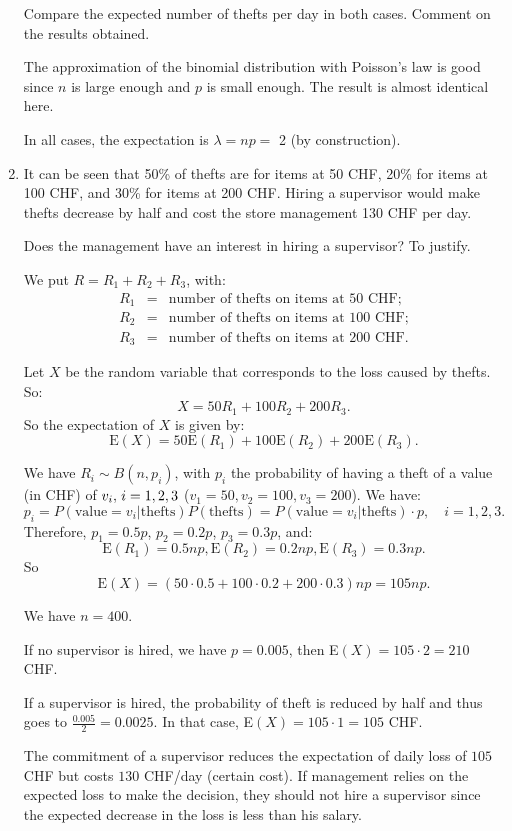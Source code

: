 \documentclass[12pt,thmsa]{article}\usepackage[]{graphicx}\usepackage[]{color}
\begin{document}
\begin{enumerate}
\noindent Compare the expected number of thefts per day in both cases. Comment on the results obtained.

The approximation of the binomial distribution with Poisson's law is good since $ n $ is large enough and $ p $ is small enough. The result is almost identical here.

In all cases, the expectation is $ \lambda = np = $ 2 (by construction).

\item It can be seen that 50\% of thefts are for items at 50 CHF, 20\% for items at 100 CHF, and 30\% for items at 200 CHF. Hiring a supervisor would make thefts decrease by half and cost the store management 130 CHF per day.

\noindent Does the management have an interest in hiring a supervisor? To justify.

We put $R=R_1+R_2+R_3$, with:
 \begin{eqnarray*}
R_{1} & = & \text{number of thefts on items at 50 CHF}; \nonumber \\
R_{2} & = & \text{number of thefts on items at 100 CHF}; \nonumber \\
R_{3} & = & \text{number of thefts on items at 200 CHF}. \nonumber %
\end{eqnarray*}

Let $X$ be the random variable that corresponds to the loss caused by thefts. So:
$$X=50R_{1}+100R_{2}+200R_{3}.$$
So the expectation of $X$ is given by:
$$\text{E}(X)=50\text{E}(R_{1})+100\text{E}(R_{2})+200\text{E}(R_{3}).$$

We have $R_i \sim B(n,p_i)$, with $ p_i $ the probability of having a theft of a value (in CHF) of $v_i, \hspace{0.05cm} i=1,2,3$ ($v_1=50, v_2=100, v_3=200$). We have:
$$p_i=P(\text{value}=v_i|\text{thefts})P(\text{thefts})=P(\text{value}=v_i|\text{thefts})\cdot p, \quad i=1,2,3.$$
Therefore, $p_1=0.5p$, $p_2=0.2p$, $p_3=0.3p$, and:
$$\text{E}(R_{1})=0.5np, \text{E}(R_{2})=0.2np, \text{E}(R_{3})=0.3np.$$
So
$$ \text{E}(X)=(50 \cdot 0.5 + 100 \cdot 0.2 + 200 \cdot 0.3)np=105np.$$

We have $n=400$.

If no supervisor is hired, we have $p=0.005$, then E$(X)=105 \cdot 2=210$ CHF.

If a supervisor is hired, the probability of theft is reduced by half and thus goes to \linebreak $\frac{0.005}{2}=0.0025$. In that case, E$(X)=105 \cdot 1=105$ CHF.

The commitment of a supervisor reduces the expectation of daily loss of $105$ CHF but costs $130$ CHF/day (certain cost). If management relies on the expected loss to make the decision, they should not hire a supervisor since the expected decrease in the loss is less than his salary.
\end{enumerate}
\end{document}

